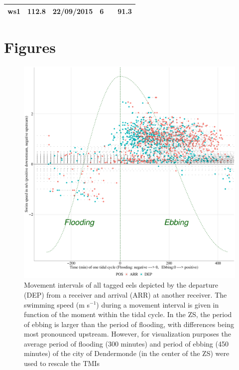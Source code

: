 \begin{table}
\begin{tabular}{c|ccccc}
ws1                                                 & 112.8                                                   & 22/09/2015                                                & 6                                                       &                         & 91.3                                                             \\ 
                                         
\bottomrule
\end{tabular}
\end{table}
\renewcommand{\arraystretch}{1}

\section{Figures}
\setcounter{figure}{0} \renewcommand{\thetable}{C.\arabic{table}}
\begin{figure}[h!]
  \centering\includegraphics[scale=0.35]{Departure_and_arrival.pdf}
  \caption{Movement intervals of all tagged eels depicted by the departure (DEP) from a receiver and arrival (ARR) at another receiver. The swimming speed (m s$^{-1}$) during a movement interval is given in function of the moment within the tidal cycle. In the ZS, the period of ebbing is larger than the period of flooding, with differences being most pronounced upstream. However, for visualization purposes the average period of flooding (300 minutes) and period of ebbing (450 minutes) of the city of Dendermonde (in the center of the ZS) were used to rescale the TMIs \citep{Levy2014HetGetijkarakteristieken}
  }
  \label{Departure_and_arrival}
\end{figure}
